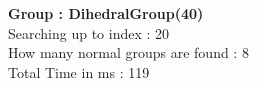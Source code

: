 \textbf{Group : DihedralGroup(40)}\\
Searching up to index : 20\\
How many normal groups are found : 8\\
Total Time in ms : 119\\
